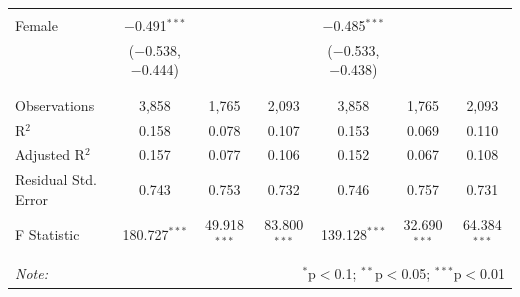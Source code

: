 \documentclass[12pt,a4paper]{article}
\numberwithin{equation}{section}
\begin{document}
\begin{landscape}
\begin{table}[!htbp]
\begin{tabular}{@{\extracolsep{5pt}}lcccccc}
			& & & & & & \\ 
			Female & $-$0.491$^{***}$ &  &  & $-$0.485$^{***}$ &  &  \\ 
			& ($-$0.538, $-$0.444) &  &  & ($-$0.533, $-$0.438) &  &  \\ 
			& & & & & & \\ 
			\hline \\[-1.8ex] 
			Observations & 3,858 & 1,765 & 2,093 & 3,858 & 1,765 & 2,093 \\ 
			R$^{2}$ & 0.158 & 0.078 & 0.107 & 0.153 & 0.069 & 0.110 \\ 
			Adjusted R$^{2}$ & 0.157 & 0.077 & 0.106 & 0.152 & 0.067 & 0.108 \\ 
			Residual Std. Error & 0.743 & 0.753 & 0.732 & 0.746 & 0.757 & 0.731 \\ 
			F Statistic & 180.727$^{***}$ & 49.918$^{***}$ & 83.800$^{***}$ & 139.128$^{***}$ & 32.690$^{***}$ & 64.384$^{***}$ \\ 
			\hline 
			\hline \\[-1.8ex] 
			\textit{Note:}  & \multicolumn{6}{r}{$^{*}$p$<$0.1; $^{**}$p$<$0.05; $^{***}$p$<$0.01} \\ 
		\end{tabular} 
	\end{table} 
	
\end{landscape}

\newpage
\end{document}
